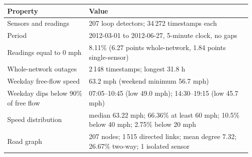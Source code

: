 \begin{tabularx}{\textwidth}{@{}lX@{}}
\toprule
Property & Value \\
\midrule
Sensors and readings & 207 loop detectors; 34\,272 timestamps each \\
Period & 2012-03-01 to 2012-06-27, 5-minute clock, no gaps \\
Readings equal to 0 mph & 8.11\% (6.27 points whole-network, 1.84 points single-sensor) \\
Whole-network outages & 2\,148 timestamps; longest 31.8 h \\
Weekday free-flow speed & 63.2 mph (weekend minimum 56.7 mph) \\
Weekday dips below 90\% of free flow & 07:05--10:45 (low 49.0 mph); 14:30--19:15 (low 45.7 mph) \\
Speed distribution & median 63.22 mph; 66.36\% at least 60 mph; 10.5\% below 40 mph; 2.75\% below 20 mph \\
Road graph & 207 nodes; 1\,515 directed links; mean degree 7.32; 26.67\% two-way; 1 isolated sensor \\
\bottomrule
\end{tabularx}
